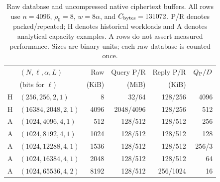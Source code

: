 \begin{table}[t]
\centering
\footnotesize
\setlength{\tabcolsep}{3pt}
\caption{Raw database and uncompressed native ciphertext buffers. All rows use
$n=4096$, $\rho_0=8$, $w=8\alpha$, and $C_{\rm bytes}=131072$.
P/R denotes packed/repeated; H denotes historical workloads and A denotes
analytical capacity examples. A rows do not assert measured performance.
Sizes are binary units; each raw database is counted once.}
\label{tab:flat-buffer-accounting}
\begin{tabular}{@{}clrrrr@{}}
\hline
 & $(N,\ell,\alpha,L)$ & Raw & Query P/R & Reply P/R & $Q_{\rm P}/D$\\
 & (bits for $\ell$) & (KiB) & (MiB) & (KiB) & \\
\hline
H & $(256,256,2,1)$ & 8 & 32/64 & 128/256 & 4096\\
H & $(16384,2048,2,1)$ & 4096 & 2048/4096 & 128/256 & 512\\
A & $(1024,4096,4,1)$ & 512 & 128/512 & 128/512 & 256\\
A & $(1024,8192,4,1)$ & 1024 & 128/512 & 128/512 & 128\\
A & $(1024,12288,4,1)$ & 1536 & 128/512 & 128/512 & 256/3\\
A & $(1024,16384,4,1)$ & 2048 & 128/512 & 128/512 & 64\\
A & $(1024,65536,4,2)$ & 8192 & 128/512 & 256/1024 & 16\\
\hline
\end{tabular}
\end{table}
